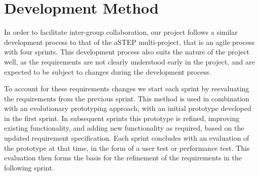 \section{Development Method} \label{sec:dev_method}
In order to facilitate inter-group collaboration, our project follows a similar development process to that of the aSTEP multi-project, that is an agile process with four sprints. This development process also suits the nature of the project well, as the requirements are not clearly understood early in the project, and are expected to be subject to changes during the development process. 

To account for these requirements changes we start each sprint by reevaluating the requirements from the previous sprint. This method is used in combination with an evolutionary prototyping approach, with an initial prototype developed in the first sprint. In subsequent sprints this prototype is refined, improving existing functionality, and adding new functionality as required, based on the updated requirement specification. Each sprint concludes with an evaluation of the prototype at that time, in the form of a user test or performance test. This evaluation then forms the basis for the refinement of the requirements in the following sprint. 

